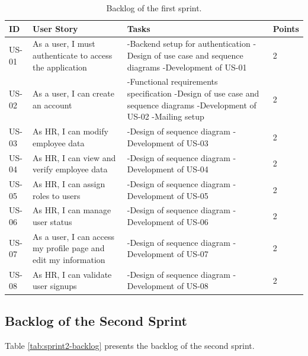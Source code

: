 \begin{table}[H]
\centering
\caption{Backlog of the first sprint.}
\label{tab:sprint1-backlog}
\begin{tabular}{|p{}|p{}|p{}|p{}|}
    \hline
    ID & User Story & Tasks & Points \\
    \hline
    US-01 & As a user, I must authenticate to access the application
    & -Backend setup for authentication\newline
    -Design of use case and sequence diagrams\newline
    -Development of US-01
    & 2 \\
    \hline
    US-02 & As a user, I can create an account
    & -Functional requirements specification\newline
    -Design of use case and sequence diagrams\newline
    -Development of US-02\newline
    -Mailing setup
    & 2 \\
    \hline
    US-03 & As HR, I can modify employee data
    & -Design of sequence diagram\newline
    -Development of US-03
    & 2 \\
    \hline
    US-04 & As HR, I can view and verify employee data
    & -Design of sequence diagram\newline
    -Development of US-04
    & 2 \\
    \hline
    US-05 & As HR, I can assign roles to users
    & -Design of sequence diagram\newline
    -Development of US-05
    & 2 \\
    \hline
    US-06 & As HR, I can manage user status
    & -Design of sequence diagram\newline
    -Development of US-06
    & 2 \\
    \hline
    US-07 & As a user, I can access my profile page and edit my information
    & -Design of sequence diagram\newline
    -Development of US-07
    & 2 \\
    \hline
    US-08 & As HR, I can validate user signups
    & -Design of sequence diagram\newline
    -Development of US-08
    & 2 \\
    \hline
\end{tabular}
\end{table}

\subsection{Backlog of the Second Sprint}
Table \ref{tab:sprint2-backlog} presents the backlog of the second sprint.

